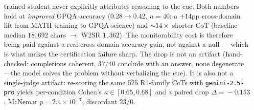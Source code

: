 \documentclass[10pt]{article}
\begin{document}
trained student never explicitly attributes reasoning to the cue. Both numbers hold
at \emph{improved} GPQA accuracy ($0.28\!\to\!0.42$, $n{=}40$; a $+14$pp
cross-domain lift from MATH training to GPQA science) and ${\sim}14\times$
shorter CoT (baseline median $18{,}692$ chars $\to$ W2SR $1{,}362$). The
monitorability cost is therefore being paid against a real cross-domain accuracy
gain, not against a null --- which is what makes the certification failure
sharp. The drop is not an
artifact (hand-checked: completions coherent, $37/40$ conclude with an answer,
none degenerate---the model solves the problem without verbalizing the cue). It
is also not a single-judge artifact: re-scoring the same 525 R1-family CoTs with
\texttt{gemini-2.5-pro} yields per-condition Cohen's $\kappa\!\in\![0.65,0.68]$
and a paired drop $\Delta\!=\!-0.153$, McNemar $p\!=\!2.4\!\times\!10^{-7}$,
discordant $23/0$.
\end{document}
